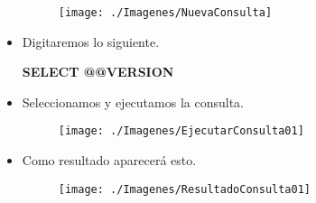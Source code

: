\begin{itemize}
					\begin{figure}[htb]
						\begin{center}
							\texttt{[image: ./Imagenes/NuevaConsulta]}
						\end{center}
					\end{figure}
				\item Digitaremos lo siguiente.
					\begin{center}
						\textbf{SELECT @@VERSION} \\
					\end{center}
				\item Seleccionamos y ejecutamos la consulta.
					\begin{figure}[htb]
						\begin{center}
							\texttt{[image: ./Imagenes/EjecutarConsulta01]}
						\end{center}
					\end{figure}
				\item Como resultado aparecerá esto.
					\begin{figure}[htb]
						\begin{center}
							\texttt{[image: ./Imagenes/ResultadoConsulta01]}
						\end{center}
					\end{figure}
					\vspace{4cm}

\end{itemize}
